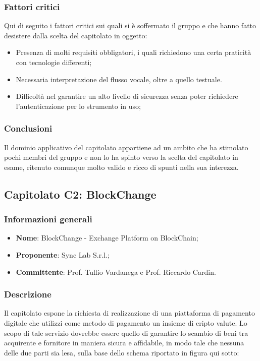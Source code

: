 \documentclass[11pt]{article}
\begin{document}
    \subsubsection{Fattori critici}
    Qui di seguito i fattori critici sui quali si è soffermato il gruppo e che hanno fatto desistere dalla scelta del capitolato in
    oggetto:
    	\begin{itemize}
            \item Presenza di molti requisiti obbligatori, i quali richiedono una certa praticità con tecnologie differenti;
            \item Necessaria interpretazione del flusso vocale, oltre a quello testuale.
            \item Difficoltà nel garantire un alto livello di sicurezza senza poter richiedere l'autenticazione per lo strumento in uso;
        \end{itemize}
        
    \subsubsection{Conclusioni}
    Il dominio applicativo del capitolato appartiene ad un ambito che ha stimolato pochi membri del gruppo e non lo ha spinto verso
    la scelta del capitolato in esame, ritenuto comunque molto valido e ricco di spunti nella sua interezza.
    
    \newpage


\subsection{Capitolato C2: BlockChange}

    \subsubsection{Informazioni generali}
    \begin{itemize}
        \item \textbf{Nome}: BlockChange - Exchange Platform on BlockChain;
        \item \textbf{Proponente}: Sync Lab S.r.l.;
        \item \textbf{Committente}: Prof. Tullio Vardanega e Prof. Riccardo Cardin.
    \end{itemize}
    
    \subsubsection{Descrizione}
	Il capitolato espone la richiesta di realizzazione di una piattaforma di pagamento digitale che utilizzi come metodo di pagamento
	un insieme di cripto valute. Lo scopo di tale servizio dovrebbe essere quello di garantire lo scambio di beni tra acquirente e
	fornitore in maniera sicura e affidabile, in modo tale che nessuna delle due parti sia lesa, sulla base dello schema riportato in
	figura qui sotto:
    
\end{document}

